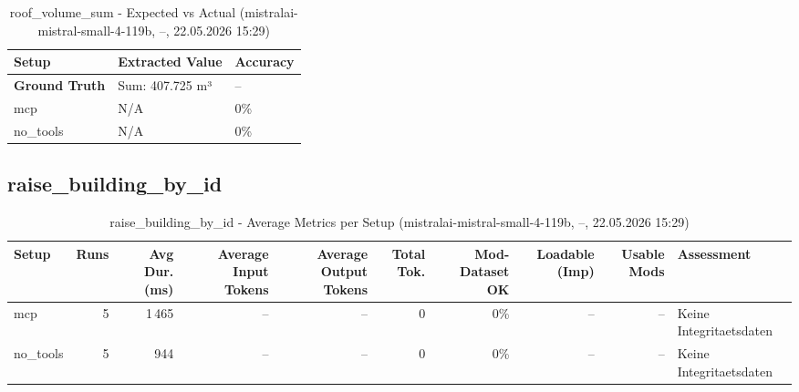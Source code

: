 \documentclass[a4paper,11pt]{article}
\begin{document}
\begin{table}[H]
\centering
\scriptsize
\caption{roof\_volume\_sum - Expected vs Actual (mistralai-mistral-small-4-119b, --, 22.05.2026 15:29)}
\begin{tabular}{l l l}
\toprule
Setup & Extracted Value & Accuracy \\
\midrule
\textbf{Ground Truth} & Sum: 407.725 m³ & -- \\
\midrule
mcp & N/A & 0\% \\
no\_tools & N/A & 0\% \\
\bottomrule
\end{tabular}
\end{table}

\clearpage

\subsection{raise\_building\_by\_id}

\begin{table}[H]
\centering
\scriptsize
\caption{raise\_building\_by\_id - Average Metrics per Setup (mistralai-mistral-small-4-119b, --, 22.05.2026 15:29)}
\label{tab:combined\_raise\_building\_by\_id\_metrics\_20260522}
\begin{tabular}{l r r r r r r r r l}
\toprule
Setup & Runs & Avg Dur. (ms) & Average Input Tokens & Average Output Tokens & Total Tok. & Mod-Dataset OK & Loadable (Imp) & Usable Mods & Assessment \\
\midrule
mcp & 5 & 1\,465 & -- & -- & 0 & 0\% & -- & -- & Keine Integritaetsdaten \\
no\_tools & 5 & 944 & -- & -- & 0 & 0\% & -- & -- & Keine Integritaetsdaten \\
\bottomrule
\end{tabular}
\end{table}
\end{document}
